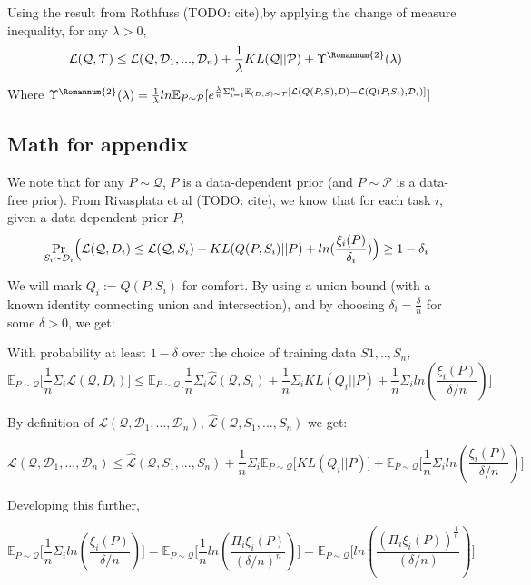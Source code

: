 \documentclass[letterpaper]{article}
\theoremstyle{definition}
\begin{document}
Using the result from Rothfuss (TODO: cite),by applying the change of measure inequality, for any $\lambda>0$,
$$\mathcal{L}(\mathcal{Q}, \mathcal{T})\leq \mathcal{L}(\mathcal{Q}, \mathcal{D}_1,...,\mathcal{D}_n) + \frac{1}{\lambda} KL(\mathcal{Q}||\mathcal{P})+\Upsilon^{\text{\Romannum{2}}}(\lambda)$$

Where $\Upsilon^{\text{\Romannum{2}}}(\lambda)=\frac{1}{\lambda}ln \mathbb{E}_{P\sim \mathcal{P}} [e^{\frac{\lambda}{n}\Sigma_{i=1}^{n}\mathbb{E}_{(D,S)\sim \mathcal{T}}[\mathcal{L}(Q(P,S),D)- \mathcal{L}(Q(P, S_i), \mathcal{D}_i)]}]$

\subsection{Math for appendix}

We note that for any $P\sim \mathcal{Q}$, $P$ is a data-dependent prior (and $P\sim \mathcal{P}$ is a data-free prior).
From Rivasplata et al (TODO: cite), we know that for each task $i$, given a data-dependent prior $P$,
$$\Pr_{S_i\sim D_i}\Bigl ( \mathcal{L}(\mathcal{Q}, D_i)\leq \mathcal{L}(\mathcal{Q}, S_i) + KL(Q(P,S_i)||P) + ln(\frac{\xi_i(P)}{\delta_i}) \Bigr )\geq 1-\delta_i$$

We will mark $Q_i:=Q(P,S_i)$ for comfort.
By using a union bound (with a known identity connecting union and intersection), and by choosing $\delta_i=\frac{\delta}{n}$ for some $\delta>0$, we get:

With probability at least $1-\delta$ over the choice of training data $S1,..,S_n$,
$$\mathbb{E}_{P\sim \mathcal{Q}} \bigl [ \frac{1}{n}\Sigma_i \mathcal{L}(\mathcal{Q}, D_i) \Bigr ] \leq \mathbb{E}_{P\sim \mathcal{Q}} \bigl [ \frac{1}{n}\Sigma_i \hat{\mathcal{L}}(\mathcal{Q}, S_i) + \frac{1}{n}\Sigma_i KL(Q_i||P) + \frac{1}{n}\Sigma_i ln(\frac{\xi_i(P)}{\delta/n}) \Bigr ]$$


By definition of $ \mathcal{L}(\mathcal{Q}, \mathcal{D}_1,...,\mathcal{D}_n)$,  $ \hat{\mathcal{L}}(\mathcal{Q}, S_1,...,S_n)$ we get:

$$\mathcal{L}(\mathcal{Q}, \mathcal{D}_1,...,\mathcal{D}_n) \leq \hat{\mathcal{L}}(\mathcal{Q}, S_1,...,S_n) + \frac{1}{n}\Sigma_i \mathbb{E}_{P\sim \mathcal{Q}} \bigl [KL(Q_i||P) \Bigr ] + \mathbb{E}_{P\sim \mathcal{Q}} \bigl [ \frac{1}{n}\Sigma_i ln(\frac{\xi_i(P)}{\delta/n}) \Bigr ]$$

Developing this further,

$$ \mathbb{E}_{P\sim \mathcal{Q}} \bigl [ \frac{1}{n}\Sigma_i ln(\frac{\xi_i(P)}{\delta/n}) \Bigr ] = \mathbb{E}_{P\sim \mathcal{Q}} \bigl [ \frac{1}{n}ln(\frac{\Pi_i\xi_i(P)}{(\delta/n)^n}) \Bigr ] = \mathbb{E}_{P\sim \mathcal{Q}} \bigl [ ln(\frac{(\Pi_i\xi_i(P))^{\frac{1}{n}}}{(\delta/n)}) \Bigr ]$$
\end{document}
